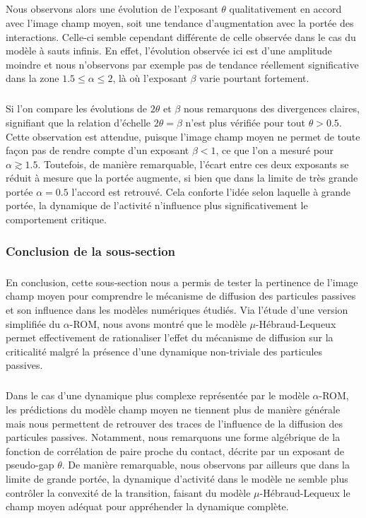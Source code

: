 \subparagraph{}Nous observons alors une évolution de l'exposant $\theta$ qualitativement en accord avec l'image champ moyen, soit une tendance d'augmentation avec la portée des interactions. Celle-ci semble cependant différente de celle observée dans le cas du modèle à sauts infinis. En effet, l'évolution observée ici est d'une amplitude moindre et nous n'observons par exemple pas de tendance réellement significative dans la zone $1.5 \leq \alpha \leq 2$, là où l'exposant $\beta$ varie pourtant fortement.

\subparagraph{}Si l'on compare les évolutions de $2\theta$ et $\beta$ nous remarquons des divergences claires, signifiant que la relation d'échelle $2\theta = \beta$ n'est plus vérifiée pour tout $\theta > 0.5$. Cette observation est attendue, puisque l'image champ moyen ne permet de toute façon pas de rendre compte d'un exposant $\beta < 1$, ce que l'on a mesuré pour $\alpha \gtrsim 1.5$. Toutefois, de manière remarquable, l'écart entre ces deux exposants se réduit à mesure que la portée augmente, si bien que dans la limite de très grande portée $\alpha = 0.5$ l'accord est retrouvé. Cela conforte l'idée selon laquelle à grande portée, la dynamique de l'activité n'influence plus significativement le comportement critique.

\subsubsection{Conclusion de la sous-section}

\subparagraph{}En conclusion, cette sous-section nous a permis de tester la pertinence de l'image champ moyen pour comprendre le mécanisme de diffusion des particules passives et son influence dans les modèles numériques étudiés. Via l'étude d'une version simplifiée du $\alpha$-ROM, nous avons montré que le modèle $\mu$-Hébraud-Lequeux permet effectivement de rationaliser l'effet du mécanisme de diffusion sur la criticalité malgré la présence d'une dynamique non-triviale des particules passives. 

\subparagraph{}Dans le cas d'une dynamique plus complexe représentée par le modèle $\alpha$-ROM, les prédictions du modèle champ moyen ne tiennent plus de manière générale mais nous permettent de retrouver des traces de l'influence de la diffusion des particules passives. Notamment, nous remarquons une forme algébrique de la fonction de corrélation de paire proche du contact, décrite par un exposant de pseudo-gap $\theta$. De manière remarquable, nous observons par ailleurs que dans la limite de grande portée, la dynamique d'activité dans le modèle ne semble plus contrôler la convexité de la transition, faisant du modèle $\mu$-Hébraud-Lequeux le champ moyen adéquat pour appréhender la dynamique complète.

